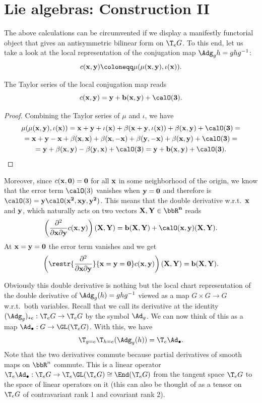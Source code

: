 \section{Lie algebras: Construction II}

The above calculations can be circumvented if we display a manifestly functorial object that gives an antisymmetric bilinear form on $\T_eG$. To this end, let us take a look at the local representation of the conjugation map $\Adg_g h=ghg^{-1}$:
\[c(\bf{x},\bf{y})\coloneqq \mu(\mu(\bf{x},\bf{y}),\iota(\bf{x})).\]

\begin{lem}
    The Taylor series of the local conjugation map reads
    \[c(\bf{x},\bf{y})=\bf{y}+b(\bf{x},\bf{y})+\calO(3).\]
\end{lem}
\begin{proof}
Combining the Taylor series of $\mu$ and $\iota$, we have
    \begin{multline}
        \mu(\mu(\bf{x},\bf{y}),\iota(\bf{x}))= \bf{x}+\bf{y}+\iota(\bf{x})+\beta(\bf{x}+\bf{y},\iota(\bf{x})) +\beta(\bf{x},\bf{y})+\calO(3)=\\
        =\bf{x}+\bf{y}-\bf{x}+\beta(\bf{x},\bf{x})+\beta(\bf{x},-\bf{x})+ \beta(\bf{y},-\bf{x})+ \beta(\bf{x},\bf{y})+\calO(3)=\\
        =\bf{y}+\beta(\bf{x},\bf{y})-\beta(\bf{y},\bf{x}) +\calO(3)=\bf{y}+b(\bf{x},\bf{y})+\calO(3).
    \end{multline}
\end{proof}

Moreover, since $c(\bf{x},0)=0$ for all $\bf{x}$ in some neighborhood of the origin, we know that the error term $\calO(3)$ vanishes when $\bf{y}=0$ and therefore is $\calO(3)=\bf{y}\calO(\bf{x}^2,\bf{x}\bf{y},\bf{y}^2)$. This means that the double derivative w.r.t.\ $\bf{x}$ and $\bf{y}$, which naturally acts on two vectors $\bf{X},\bf{Y}\in\bbR^n$ reads
\[\left(\frac{\partial^2}{\partial \bf{x}\partial \bf{y}}c(\bf{x},\bf{y})\right)(\bf{X},\bf{Y})=b(\bf{X},\bf{Y})+\calO(\bf{x},\bf{y})(\bf{X},\bf{Y}).\]
At $\bf{x}=\bf{y}=0$ the error term vanishes and we get
\[\left(\restr{\frac{\partial^2}{\partial \bf{x}\partial \bf{y}}}{\bf{x}=\bf{y}=0}c(\bf{x},\bf{y})\right)(\bf{X},\bf{Y})=b(\bf{X},\bf{Y}).\]

Obviously this double derivative is nothing but the local chart representation of the double derivative of $\Adg_g(h)= ghg^{-1}$ viewed as a map $G\times G\to G$ w.r.t.\ both variables. Recall that we call its derivative at the identity $(\Adg_g)_{\ast e}:\T_eG\to \T_e G$ by the symbol $\Ad_g$. We can now think of this as a map $\Ad_\bullet:G\to \GL(\T_e G)$. With this, we have
\[\T_{g=e}\T_{h=e}(\Adg_g(h))=\T_e \Ad_\bullet.\]
Note that the two derivatives commute because partial derivatives of smooth maps on $\bbR^n$ commute. This is a linear operator $\T_e \Ad_\bullet:\T_eG\to \T_e\GL(\T_e G)\cong \End(\T_eG)$ from the tangent space $\T_e G$ to the space of linear operators on it (this can also be thought of as a tensor on $\T_e G$ of contravariant rank 1 and covariant rank 2). 

